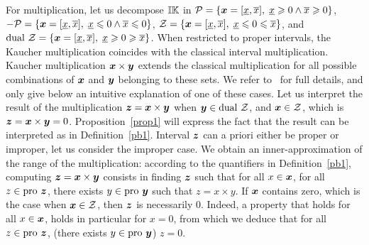 \documentclass{sig-alternate-05-2015}
\newcommand{\pro}{\mbox{pro }}
\def\K{{\Bbb I \Bbb K}}
\begin{document}
For multiplication, let us decompose $\K$ in ${\cal P} = \{\x=[\underline x,\overline x], \; \underline x \geqslant 0 \wedge
\overline x \geqslant 0\}$, ${- \cal P} = \{\x=[\underline x,\overline x], \; \underline x \leqslant 0 \wedge
\overline x \leqslant 0\}$, 
${\cal Z} = \{\x=[\underline x,\overline x], \; \underline x \leqslant 0 \leqslant \overline x\}$, and 
${\mbox{dual } \cal Z} = \{\x=[\underline x,\overline x], \; \underline x \geqslant 0 \geqslant \overline x\}$. 
When restricted to proper intervals, the Kaucher multiplication coincides with the 
classical interval multiplication. 
Kaucher multiplication $\x \times \y$ extends the classical multiplication for all possible combinations of $\x$ and $\y$
belonging to these sets. We refer to~\cite{Kaucher} for full details, and only give below an intuitive explanation of one of these cases.
Let us  interpret the result of the multiplication $\z = \x \times \y$ when $\y \in \mbox{dual } \cal Z$, 
and $\x \in {\cal Z}$, which is $\z = \x \times \y = 0$. Proposition~\ref{prop1} will express the fact that 
the result can be interpreted as in Definition~\ref{pb1}. Interval $\z$ can a priori either be proper or improper, 
let us consider the improper case. We obtain an inner-approximation of the range of the multiplication: 
according to the quantifiers in Definition~\ref{pb1}, 
computing $\z = \x \times \y$ consists in finding $\z$ such that 
for all $x \in \x$, for all $z \in \pro \z$, there exists $y \in \pro \y$ such that $z=x \times y$. If $\x$ contains zero, 
which is the case when $\x \in {\cal Z}$, then $\z$ is necessarily $0$. 
Indeed, a property that holds for all $x \in \x$, holds in particular for $x=0$, from which we deduce that 
for all $z \in \pro \z$, (there exists $y \in \pro \y$) $z=0$.
\end{document}
